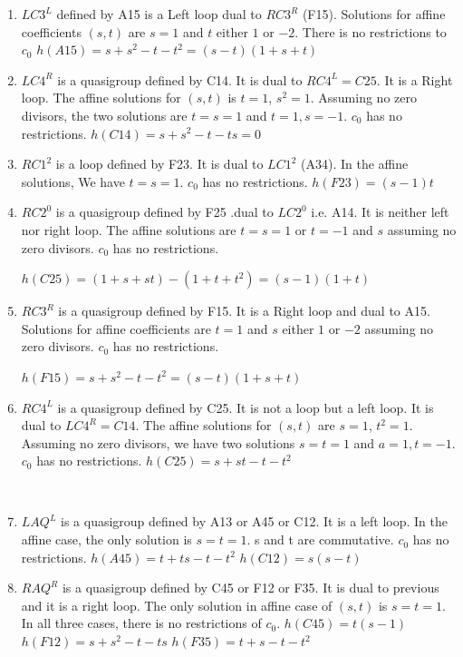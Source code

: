 \documentclass[11pt]{amsart}
\theoremstyle{definition}
\begin{document}
\begin{enumerate}
    \item[(15)] $LC3^L$ defined by A15 is a Left loop dual to $RC3^R$ (F15). Solutions for affine coefficients $(s,t)$ are $s=1$ and $t$ either $1$ or $-2$. There is no restrictions to $c_0$
    $h(A15) = s+s^2-t-t^2=(s-t)(1+s+t) $
    
    \item[(16)] $LC4^R$ is a quasigroup defined by C14. It is dual to $RC4^L=C25$. It is a Right loop. The affine solutions for $(s,t)$ is $t=1$, $s^2=1$. Assuming no zero divisors, the two solutions are $t=s=1$ and $t=1, s=-1$. $c_0$ has no restrictions.
    $h(C14) = s+s^2-t-ts =0$
    
    
    \item[(17)] $RC1^2$ is a loop defined by F23. It is dual to $LC1^2$ (A34). In the affine solutions, We have $t=s=1$. $c_0$ has no restrictions.
    $h(F23) = (s-1)t$
    
    \item[(18)] $RC2^0$ is a quasigroup defined by F25 .dual to $LC2^0$ i.e. A14. It is neither left nor right loop. The affine solutions are  $t=s=1$ or $t=-1$ and $s$ assuming no zero divisors. $c_0$ has no restrictions. 

    $h(C25)=(1+s+st)-(1+t+t^2)=(s-1)(1+t)$
    \item[(19)] $RC3^R$ is a quasigroup defined by F15. It is a Right loop and dual to A15. Solutions for affine coefficients are $t=1$ and $s$ either $1$ or $-2$ assuming no zero divisors. $c_0$ has no restrictions.

    $h(F15) = s+s^2-t-t^2=(s-t)(1+s+t)$
    
    \item[(20)] $RC4^L$ is a quasigroup defined by C25. It is not a loop but a left loop. It is dual to $LC4^R=C14$. The affine solutions for $(s,t)$ are $s=1$, $t^2=1$. Assuming no zero divisors, we have two solutions $s=t=1$ and $a=1, t=-1$. $c_0$ has no restrictions.
    $h(C25) = s+st -t-t^2$
    

    \
    \item[(21)] $LAQ^L$ is a quasigroup defined by A13 or A45 or C12. It is a left loop. In the affine case, the only solution is $s=t=1$. s and t are  commutative. $c_0$ has no restrictions.
    $h(A45) = t+ts-t-t^2$
    $h(C12) = s(s-t)$
    
    
    \item[(22)] $RAQ^R$ is a quasigroup defined by C45 or F12 or F35. It is dual to previous and it is a right loop. The only solution in affine case of $(s,t)$ is $s=t=1$. In all three cases, there is no restrictions of $c_0$.
    $h(C45) = t(s-1)$
    $h(F12) = s +s^2 -t -ts$
    $h(F35) = t+s -t -t^2$


\end{enumerate}
\end{document}

